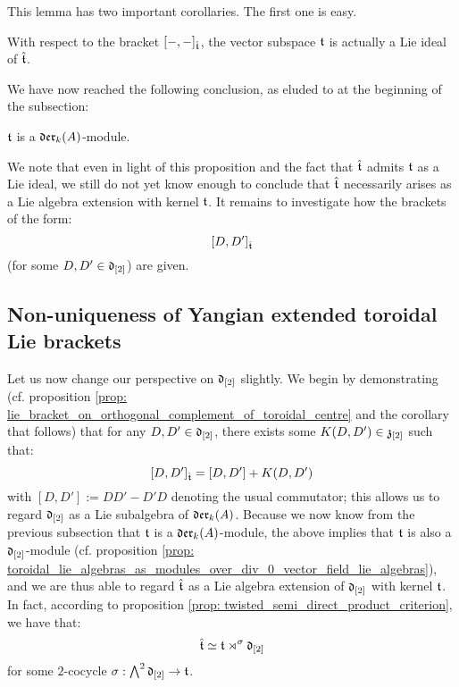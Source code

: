         This lemma has two important corollaries. The first one is easy.
        \begin{corollary}
            With respect to the bracket $[-, -]_{\hat{\mathfrak{t}}}$, the vector subspace $\mathfrak{t}$ is actually a Lie ideal of $\hat{\mathfrak{t}}$.
        \end{corollary}

        We have now reached the following conclusion, as eluded to at the beginning of the subsection:
        \begin{proposition} \label{prop: toroidal_lie_algebras_as_modules_over_vector_field_lie_algebras}
            $\mathfrak{t}$ is a $\mathfrak{der}_k(A)$-module.
        \end{proposition}
        We note that even in light of this proposition and the fact that $\hat{\mathfrak{t}}$ admits $\mathfrak{t}$ as a Lie ideal, we still do not yet know enough to conclude that $\hat{\mathfrak{t}}$ necessarily arises as a Lie algebra extension with kernel $\mathfrak{t}$. It remains to investigate how the brackets of the form:
            $$[D, D']_{\hat{\mathfrak{t}}}$$
        (for some $D, D' \in \mathfrak{d}_{[2]}$) are given.

    \subsection{Non-uniqueness of Yangian extended toroidal Lie brackets}
        Let us now change our perspective on $\mathfrak{d}_{[2]}$ slightly. We begin by demonstrating (cf. proposition \ref{prop: lie_bracket_on_orthogonal_complement_of_toroidal_centre} and the corollary that follows) that for any $D, D' \in \mathfrak{d}_{[2]}$, there exists some $K(D, D') \in \mathfrak{z}_{[2]}$ such that:
            $$[D, D']_{\hat{\mathfrak{t}}} = [D, D'] + K(D, D')$$
        with $[D, D'] := DD' - D'D$ denoting the usual commutator; this allows us to regard $\mathfrak{d}_{[2]}$ as a Lie subalgebra of $\mathfrak{der}_k(A)$. Because we now know from the previous subsection that $\mathfrak{t}$ is a $\mathfrak{der}_k(A)$-module, the above implies that $\mathfrak{t}$ is also a $\mathfrak{d}_{[2]}$-module (cf. proposition \ref{prop: toroidal_lie_algebras_as_modules_over_div_0_vector_field_lie_algebras}), and we are thus able to regard $\hat{\mathfrak{t}}$ as a Lie algebra extension of $\mathfrak{d}_{[2]}$ with kernel $\mathfrak{t}$. In fact, according to proposition \ref{prop: twisted_semi_direct_product_criterion}, we have that:
            $$\hat{\mathfrak{t}} \simeq \mathfrak{t} \rtimes^{\sigma} \mathfrak{d}_{[2]}$$
        for some $2$-cocycle $\sigma: \bigwedge^2 \mathfrak{d}_{[2]} \to \mathfrak{t}$.
        
